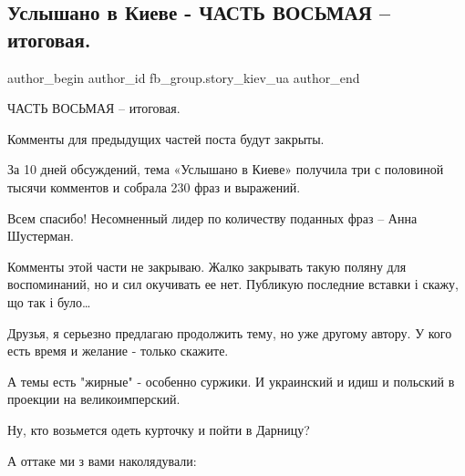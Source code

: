  
 
 
 
 
 
\subsection{Услышано в Киеве - ЧАСТЬ ВОСЬМАЯ – итоговая.}
\label{sec:29_07_2021.fb.fb_group.story_kiev_ua.1.uslyshano_v_kieve_8}
 
\ifcmt
 author_begin
   author_id fb_group.story_kiev_ua
 author_end
\fi

ЧАСТЬ ВОСЬМАЯ – итоговая.

Комменты для предыдущих частей поста будут закрыты.

За 10 дней обсуждений, тема «Услышано в Киеве» получила три с половиной тысячи
комментов и собрала 230 фраз и выражений.

Всем спасибо! Несомненный лидер по количеству поданных фраз – Анна Шустерман.

Комменты этой части не закрываю. Жалко закрывать такую поляну для воспоминаний,
но и сил окучивать ее нет. Публикую последние вставки і скажу, що так і було… 

Друзья, я серьезно предлагаю продолжить тему, но уже другому автору. У кого
есть время и желание - только скажите.

А темы есть "жирные" - особенно суржики. И украинский и идиш и польский в
проекции на великоимперский. 

Ну, кто возьмется одеть курточку и пойти в Дарницу?

А оттаке ми з вами наколядували:

